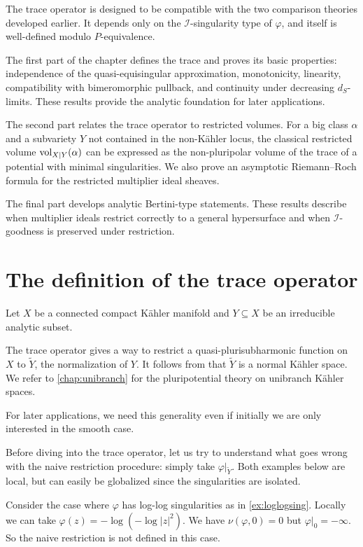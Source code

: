 The trace operator is designed to be compatible with the two comparison theories developed earlier. It depends only on the $\mathcal{I}$-singularity type of $\varphi$, and itself is well-defined modulo $P$-equivalence.

The first part of the chapter defines the trace and proves its basic properties: independence of the quasi-equisingular approximation, monotonicity, linearity, compatibility with bimeromorphic pullback, and continuity under decreasing $d_S$-limits. These results provide the analytic foundation for later applications.

The second part relates the trace operator to restricted volumes. For a big class $\alpha$ and a subvariety $Y$ not contained in the non-K\"ahler locus, the classical restricted volume $\operatorname{vol}_{X|Y}(\alpha)$ can be expressed as the non-pluripolar volume of the trace of a potential with minimal singularities. We also prove an asymptotic Riemann--Roch formula for the restricted multiplier ideal sheaves.

The final part develops analytic Bertini-type statements. These results describe when multiplier ideals restrict correctly to a general hypersurface and when $\mathcal I$-goodness is preserved under restriction.


\section{The definition of the trace operator}\label{sec:trace_def}

Let $X$ be a connected compact Kähler manifold and $Y\subseteq X$ be an irreducible analytic subset.

The trace operator gives a way to restrict a quasi-plurisubharmonic function on $X$ to $\widetilde{Y}$, the normalization of $Y$.
It follows from \cite[Proposition~3.6]{GK20} that $\widetilde{Y}$ is a normal Kähler space.
We refer to \cref{chap:unibranch} for the pluripotential theory on unibranch Kähler spaces.

For later applications, we need this generality even if initially we are only interested in the smooth case.


Before diving into the trace operator, let us try to understand what goes wrong with the naive restriction procedure: simply take $\varphi|_{\widetilde{Y}}$. Both examples below are local, but can easily be globalized since the singularities are isolated.
\begin{example}\label{ex:naive_res1}
    Consider the case where $\varphi$ has log-log singularities as in \cref{ex:loglogsing}. Locally we can take $\varphi(z)=-\log (-\log |z|^2)$. We have $\nu(\varphi,0)=0$ but $\varphi|_0=-\infty$. So the naive restriction is not defined in this case.
\end{example}

